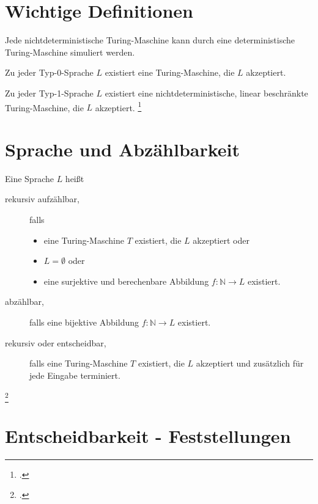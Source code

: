 \documentclass{lehramt-informatik-haupt}
\begin{document}
\section{Wichtige Definitionen}

Jede nichtdeterministische Turing-Maschine kann durch eine
deterministische Turing-Maschine simuliert werden.

Zu jeder Typ-0-Sprache $L$ existiert eine Turing-Maschine, die $L$
akzeptiert.

Zu jeder Typ-1-Sprache $L$ existiert eine nichtdeterministische, linear
beschränkte Turing-Maschine, die $L$ akzeptiert.
\footcite[Seite 35]{theo:fs:4}

%

\section{Sprache und Abzählbarkeit}

Eine Sprache $L$ heißt

\begin{description}
\item[rekursiv aufzählbar,] falls

\begin{itemize}
\item eine Turing-Maschine $T$ existiert, die $L$ akzeptiert oder

\item $L = \emptyset$ oder

\item eine surjektive und berechenbare Abbildung $f: \mathbb{N}
\rightarrow L$ existiert.
\end{itemize}

\item[abzählbar,] falls eine bijektive Abbildung $f: \mathbb{N}
\rightarrow L$ existiert.

\item[rekursiv oder entscheidbar,] falls eine
Turing-Maschine $T$ existiert, die $L$ akzeptiert und zusätzlich für
jede Eingabe terminiert.
\end{description}
\footcite[Seite 37]{theo:fs:4}

%

\section{Entscheidbarkeit - Feststellungen}
\end{document}
